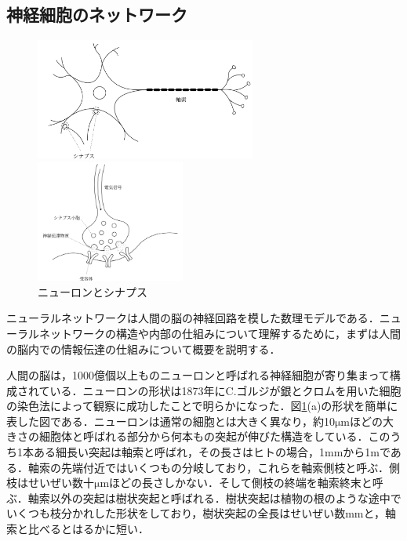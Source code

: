 \documentclass[a4paper,11pt]{jsreport}
\begin{document}
\subsection{神経細胞のネットワーク}
\begin{figure}[H]
  \begin{minipage}[b]{0.5\linewidth}
    \centering
    \includegraphics[height=4cm]{image/ニューロン.png}
  \end{minipage}
  \begin{minipage}[b]{0.5\linewidth}
    \centering
    \includegraphics[height=4cm]{image/シナプス.png}
  \end{minipage}
  \caption{ニューロンとシナプス}
  \label{ニューロン}
\end{figure}
ニューラルネットワークは人間の脳の神経回路を模した数理モデルである．ニューラルネットワークの構造や内部の仕組みについて理解するために，まずは人間の脳内での情報伝達の仕組みについて概要を説明する．\par
人間の脳は，1000億個以上ものニューロンと呼ばれる神経細胞が寄り集まって構成されている．ニューロンの形状は1873年にC.ゴルジが銀とクロムを用いた細胞の染色法によって観察に成功したことで明らかになった．図\ref{ニューロン}(a)の形状を簡単に表した図である．ニューロンは通常の細胞とは大きく異なり，約10$\mathrm{\mu}$mほどの大きさの細胞体と呼ばれる部分から何本もの突起が伸びた構造をしている．このうち1本ある細長い突起は軸索と呼ばれ，その長さはヒトの場合，1mmから1mである．軸索の先端付近ではいくつもの分岐しており，これらを軸索側枝と呼ぶ．側枝はせいぜい数十$\mathrm{\mu}$mほどの長さしかない．そして側枝の終端を軸索終末と呼ぶ．軸索以外の突起は樹状突起と呼ばれる．樹状突起は植物の根のような途中でいくつも枝分かれした形状をしており，樹状突起の全長はせいぜい数mmと，軸索と比べるとはるかに短い．\par
\end{document}
